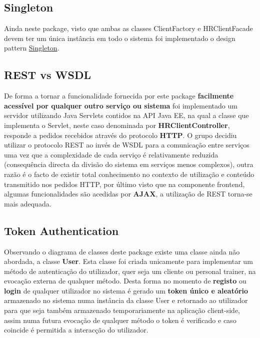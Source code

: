 \subsection{Singleton}

\hspace{5mm} Ainda neste package, visto que ambas as classes ClientFactory e HRClientFacade devem ter um única instância em todo o sistema foi implementado o design pattern \href{https://refactoring.guru/design-patterns/singleton}{Singleton}.

\subsection{REST vs WSDL}

\hspace{5mm} De forma a tornar a funcionalidade fornecida por este package \textbf{facilmente acessível por qualquer outro serviço ou sistema} foi implementado um servidor utilizando Java Servlets contidos na API Java EE, na qual a classe que implementa o Servlet, neste caso denominada por \textbf{HRClientController}, responde a pedidos recebidos através do protocolo \textbf{HTTP}. O grupo decidiu utilizar o protocolo REST ao invés de WSDL para a comunicação entre serviços uma vez que a complexidade de cada serviço é relativamente reduzida (consequência directa da divisão do sistema em serviços menos complexos), outra razão é o facto de existir total conhecimento no contexto de utilização e conteúdo transmitido nos pedidos HTTP, por 
último visto que na componente frontend, algumas funcionalidades são acedidas por \textbf{AJAX}, a utilização de REST torna-se mais adequada. 


\subsection{Token Authentication}

\hspace{5mm} Observando o diagrama de classes deste package existe uma classe ainda não abordada, a classe \textbf{User}. Esta classe foi criada unicamente para implementar um método de autenticação do utilizador, quer seja um cliente ou personal trainer, na evocação externa de qualquer método. Desta forma no momento de \textbf{registo} ou \textbf{login} de qualquer utilizador no sistema é gerado um \textbf{token único e aleatório} armazenado no sistema numa instância da classe User e retornado ao utilizador para que seja também armazenado temporariamente na aplicação client-side, assim numa futura evocação de qualquer método o token é verificado e caso coincide é permitida a interacção do utilizador.


